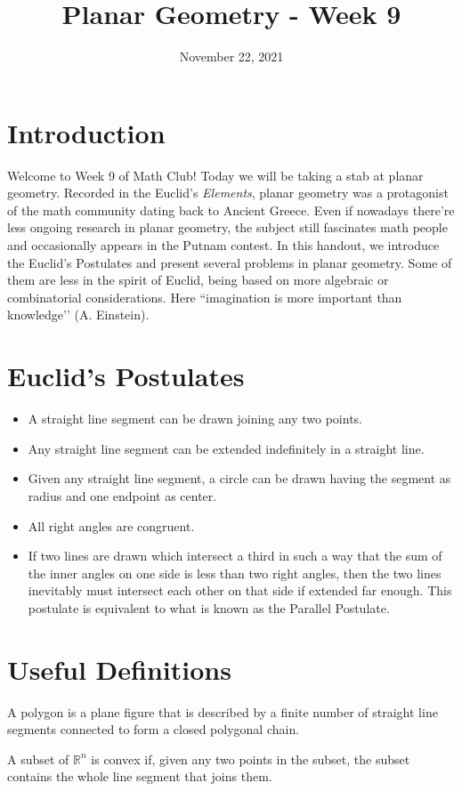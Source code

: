 \documentclass{article}
\title{Planar Geometry - Week 9}
\author{}
\date{November 22, 2021}
\begin{document}
\section{Introduction}
Welcome to Week 9 of Math Club! Today we will be taking a stab at planar geometry. Recorded in the Euclid's \emph{Elements}, planar geometry was a protagonist of the math community dating back to Ancient Greece. Even if nowadays there're less ongoing research in planar geometry, the subject still fascinates math people and occasionally appears in the Putnam contest. In this handout, we introduce the Euclid's Postulates and present several problems in planar geometry. Some of them are less in the spirit of Euclid, being based on more algebraic or combinatorial considerations. Here “imagination is more important than knowledge’’ (A. Einstein).

\section{Euclid's Postulates} 
\begin{itemize}
    \item A straight line segment can be drawn joining any two points.
    \item Any straight line segment can be extended indefinitely in a straight line.
    \item Given any straight line segment, a circle can be drawn having the segment as radius and one endpoint as center.
    \item All right angles are congruent.
    \item If two lines are drawn which intersect a third in such a way that the sum of the inner angles on one side is less than two right angles, then the two lines inevitably must intersect each other on that side if extended far enough. This postulate is equivalent to what is known as the Parallel Postulate.
\end{itemize}

\section{Useful Definitions}
\begin{definition}
A polygon is a plane figure that is described by a finite number of straight line segments connected to form a closed polygonal chain.
\end{definition}

\begin{definition}
A subset of $\mathbb{R}^{n}$ is convex if, given any two points in the subset, the subset contains the whole line segment that joins them.
\end{definition}
\end{document}
